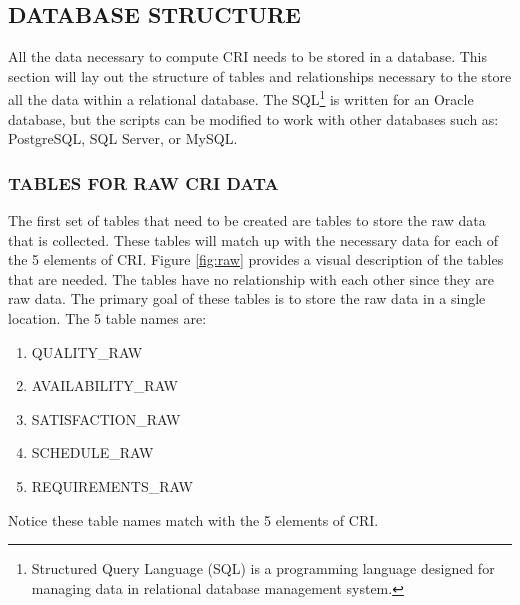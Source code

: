 \documentclass[SDSUThesis.tex]{subfiles}
\begin{document}
    \subsection{DATABASE STRUCTURE}
        All the data necessary to compute CRI needs to be stored in a database.  This section will 
        lay out the structure of tables and relationships necessary to the store all the data
        within a relational database.  The SQL\footnote{Structured Query Language (SQL) is 
        a programming language designed for managing data in relational database 
        management system.} 
        is written for an Oracle
        database, but the scripts can be modified to work with other databases
        such as: PostgreSQL, SQL Server, or MySQL.  
        
        \subsubsection{TABLES FOR RAW CRI DATA}
        
            The first set of tables that need to be created are tables
            to store the raw data that is collected.  These tables
            will match up with the necessary data for each of the 5 elements
            of CRI.  Figure \ref{fig:raw} provides a visual description
            of the tables that are needed.  The tables have no relationship
            with each other since they are raw data.  The primary goal of
            these tables is to store the raw data in a single location. The
            5 table names are:
            \begin{enumerate}
                \item QUALITY\_RAW
                \item AVAILABILITY\_RAW
                \item SATISFACTION\_RAW
                \item SCHEDULE\_RAW
                \item REQUIREMENTS\_RAW
            \end{enumerate}
            Notice these table names match with the 5 elements of CRI.
        
\end{document}
